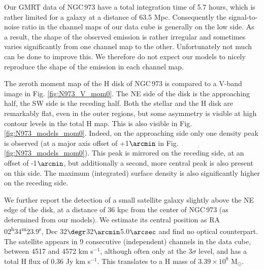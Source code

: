\documentclass{aa}
\begin{document}
Our GMRT data of NGC\,973 have a total integration time of 5.7 hours, which is rather limited for a galaxy at a distance of 63.5 Mpc. Consequently the signal-to-noise ratio in the channel maps of our data cube is generally on the low side. As a result, the shape of the observed emission is rather irregular and sometimes varies significantly from one channel map to the other. Unfortunately not much can be done to improve this. We therefore do not expect our models to nicely reproduce the shape of the emission in each channel map.
\par
The zeroth moment map of the H{} disk of NGC\,973 is compared to a V-band image in Fig. \ref{fig:N973_V_mom0}. The NE side of the disk is the approaching half, the SW side is the receding half. Both the stellar and the H{} disk are remarkably flat, even in the outer regions, but some asymmetry is visible at high contour levels in the total H{} map. This is also visible in Fig. \ref{fig:N973_models_mom0}. Indeed, on the approaching side only one density peak is observed (at a major axis offset of +1$\arcmin$ in Fig. \ref{fig:N973_models_mom0}). This peak is mirrored on the receding side, at an offset of -1$\arcmin$, but additionally a second, more central peak is also present on this side. The maximum (integrated) surface density is also significantly higher on the receding side.
\par
We further report the detection of a small satellite galaxy slightly above the NE edge of the disk, at a distance of 36 kpc from the center of NGC\,973 (as determined from our models). We estimate its central position as RA 02\textsuperscript{h}34\textsuperscript{m}23.9\textsuperscript{s}, Dec 32$\degr$32$\arcmin$5.0$\arcsec$ and find no optical counterpart. The satellite appears in 9 consecutive (independent) channels in the data cube, between 4517 and 4572 km s$^{-1}$, although often only at the 3$\sigma$ level, and has a total H{} flux of 0.36 Jy km s$^{-1}$. This translates to a H{} mass of $3.39\times 10^{8}$ M$_{\odot}$. 
\par
\end{document}
